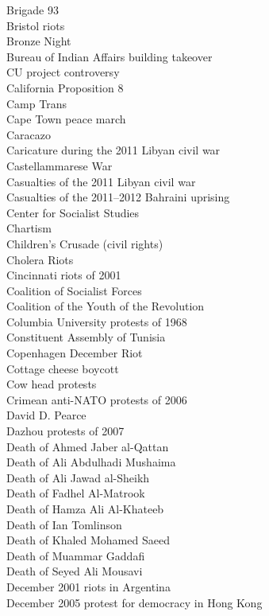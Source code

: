 Brigade 93\\
Bristol riots\\
Bronze Night\\
Bureau of Indian Affairs building takeover\\
CU project controversy\\
California Proposition 8\\
Camp Trans\\
Cape Town peace march\\
Caracazo\\
Caricature during the 2011 Libyan civil war\\
Castellammarese War\\
Casualties of the 2011 Libyan civil war\\
Casualties of the 2011–2012 Bahraini uprising\\
Center for Socialist Studies\\
Chartism\\
Children's Crusade (civil rights)\\
Cholera Riots\\
Cincinnati riots of 2001\\
Coalition of Socialist Forces\\
Coalition of the Youth of the Revolution\\
Columbia University protests of 1968\\
Constituent Assembly of Tunisia\\
Copenhagen December Riot\\
Cottage cheese boycott\\
Cow head protests\\
Crimean anti-NATO protests of 2006\\
David D. Pearce\\
Dazhou protests of 2007\\
Death of Ahmed Jaber al-Qattan\\
Death of Ali Abdulhadi Mushaima\\
Death of Ali Jawad al-Sheikh\\
Death of Fadhel Al-Matrook\\
Death of Hamza Ali Al-Khateeb\\
Death of Ian Tomlinson\\
Death of Khaled Mohamed Saeed\\
Death of Muammar Gaddafi\\
Death of Seyed Ali Mousavi\\
December 2001 riots in Argentina\\
December 2005 protest for democracy in Hong Kong\\
